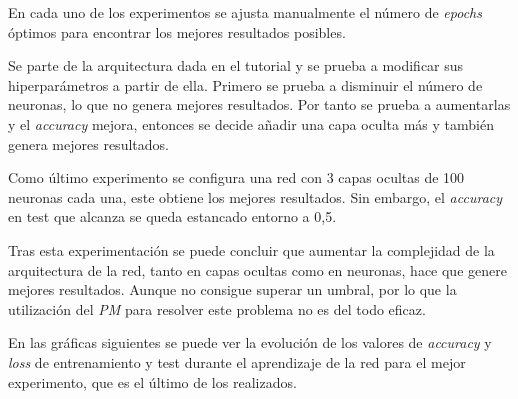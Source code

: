 \documentclass{uc3mpracticas}
\begin{document}
En cada uno de los experimentos se ajusta manualmente el número de \textit{epochs} óptimos para encontrar los mejores resultados posibles.

\vspace{2mm}

Se parte de la arquitectura dada en el tutorial y se prueba a modificar sus hiperparámetros a partir de ella. Primero se prueba a disminuir el número de neuronas, lo que no genera mejores resultados. Por tanto se prueba a aumentarlas y el \textit{accuracy} mejora, entonces se decide añadir una capa oculta más y también genera mejores resultados.

\vspace{1mm}

Como último experimento se configura una red con 3 capas ocultas de 100 neuronas cada una, este obtiene los mejores resultados. Sin embargo, el \textit{accuracy} en test que alcanza se queda estancado entorno a 0,5.

\vspace{2mm}

Tras esta experimentación se puede concluir que aumentar la complejidad de la arquitectura de la red, tanto en capas ocultas como en neuronas, hace que genere mejores resultados. Aunque no consigue superar un umbral, por lo que la utilización del \textit{PM} para resolver este problema no es del todo eficaz.

\vspace{3mm}

En las gráficas siguientes se puede ver la evolución de los valores de \textit{accuracy} y \textit{loss} de entrenamiento y test durante el aprendizaje de la red para el mejor experimento, que es el último de los realizados.

\newpage
\end{document}
